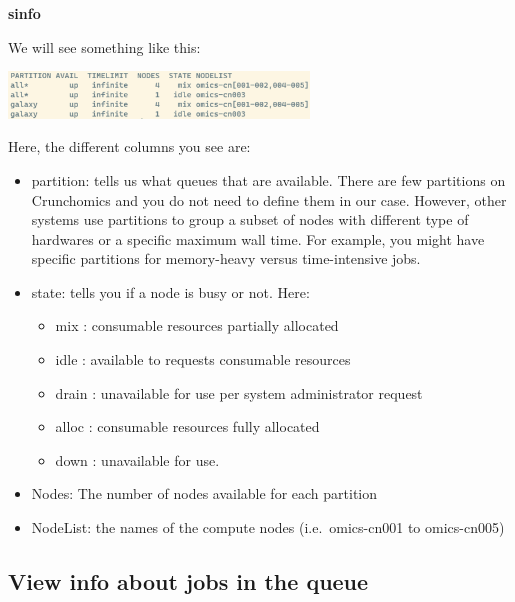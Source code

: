 \documentclass[
  letterpaper,
  DIV=11,
  numbers=noendperiod]{scrreprt}
\newenvironment{Shaded}{}{}
\newcommand{\ExtensionTok}[1]{\textcolor[rgb]{0.84,0.23,0.29}{\textbf{#1}}}
\providecommand{\tightlist}{%
  \setlength{\itemsep}{0pt}\setlength{\parskip}{0pt}}\usepackage{longtable,booktabs,array}
\begin{document}
\begin{Shaded}
\begin{Highlighting}[]
\ExtensionTok{sinfo}
\end{Highlighting}
\end{Shaded}

We will see something like this:

\begin{center}
\includegraphics[width=0.6\textwidth,height=\textheight]{../img/sinfo.png}
\end{center}

Here, the different columns you see are:

\begin{itemize}
\tightlist
\item
  partition: tells us what queues that are available. There are few
  partitions on Crunchomics and you do not need to define them in our
  case. However, other systems use partitions to group a subset of nodes
  with different type of hardwares or a specific maximum wall time. For
  example, you might have specific partitions for memory-heavy versus
  time-intensive jobs.
\item
  state: tells you if a node is busy or not. Here:

  \begin{itemize}
  \tightlist
  \item
    mix : consumable resources partially allocated
  \item
    idle : available to requests consumable resources
  \item
    drain : unavailable for use per system administrator request
  \item
    alloc : consumable resources fully allocated
  \item
    down : unavailable for use.
  \end{itemize}
\item
  Nodes: The number of nodes available for each partition
\item
  NodeList: the names of the compute nodes (i.e.~omics-cn001 to
  omics-cn005)
\end{itemize}

\subsection{View info about jobs in the
queue}\label{view-info-about-jobs-in-the-queue}
\end{document}
